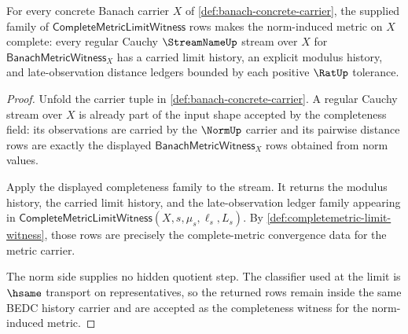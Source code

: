 \begin{theorem}
\label{thm:banach-norm-metric-completeness}
For every concrete Banach carrier $X$ of
\autoref{def:banach-concrete-carrier}, the supplied family of
$\mathsf{CompleteMetricLimitWitness}$ rows makes the norm-induced metric on
$X$ complete: every regular Cauchy $\StreamNameUp$ stream over $X$ for
$\mathsf{BanachMetricWitness}_X$ has a carried limit history, an explicit
modulus history, and late-observation distance ledgers bounded by each
positive $\RatUp$ tolerance.
\end{theorem}
\begin{proof}
Unfold the carrier tuple in \autoref{def:banach-concrete-carrier}. A regular
Cauchy stream over $X$ is already part of the input shape accepted by the
completeness field: its observations are carried by the $\NormUp$ carrier and
its pairwise distance rows are exactly the displayed
$\mathsf{BanachMetricWitness}_X$ rows obtained from norm values.

Apply the displayed completeness family to the stream. It returns the modulus
history, the carried limit history, and the late-observation ledger family
appearing in
$\mathsf{CompleteMetricLimitWitness}(X,s,\mu_s,\ell_s,L_s)$. By
\autoref{def:completemetric-limit-witness}, those rows are precisely the
complete-metric convergence data for the metric carrier.

The norm side supplies no hidden quotient step. The classifier used at the
limit is $\hsame$ transport on representatives, so the returned rows remain
inside the same BEDC history carrier and are accepted as the completeness
witness for the norm-induced metric.
\end{proof}

